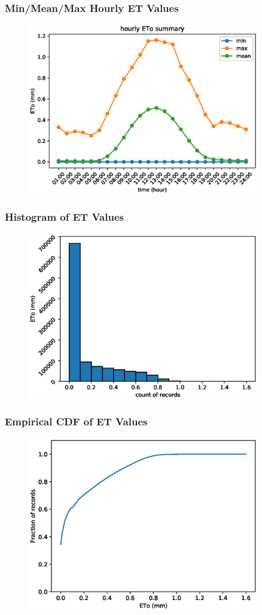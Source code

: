 \begin{frame}
\frametitle{Min/Mean/Max Hourly ET Values}
\begin{figure}
\includegraphics[width=0.9\textwidth]{images/summary-hourly-eto-values}
\end{figure}
\end{frame}

\begin{frame}
\frametitle{Histogram of ET Values}
\begin{figure}
\includegraphics[width=0.9\textwidth]{images/hist-eto}
\end{figure}
\end{frame}

\begin{frame}
\frametitle{Empirical CDF of ET Values}
\begin{figure}
\includegraphics[width=0.9\textwidth]{images/ecdf}
\end{figure}
\end{frame}
